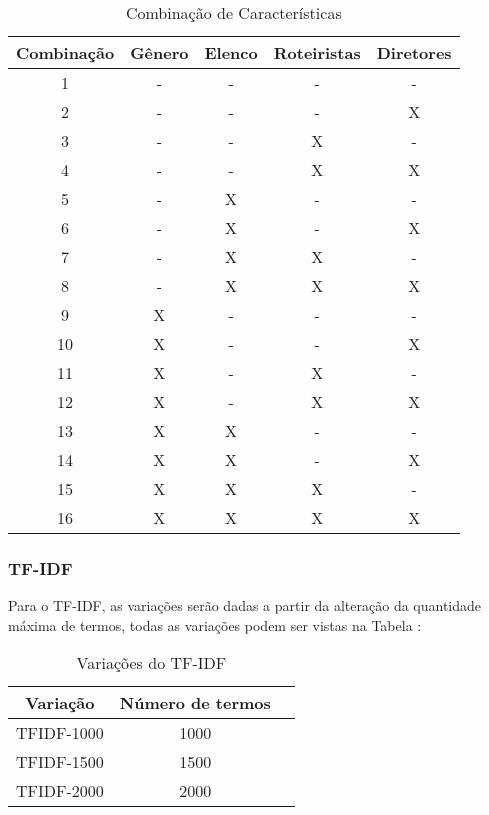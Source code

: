 \begin{table}[H]
\label{tab:combinacoes}
\centering
\begin{tabular}{|c| c | c | c | c|}
\hline
Combinação &  Gênero  & Elenco & Roteiristas & Diretores  \\ 
\hline
1 & -  & - & - & - \\
\hline
2 & -  & - & - & X\\
\hline
3 & -  & - & X & - \\
\hline
4 & -  & - & X & X \\
\hline   
5 & -  & X & - & - \\
\hline   
6 & -  & X & - & X \\
\hline   
7 & -  & X & X & - \\
\hline   
8 & -  & X & X & X \\
\hline   
9 & X  & - & - & - \\
\hline   
10 & X  & - & - & X \\
\hline  
11 & X  & - & X & - \\
\hline  
12 & X  & - & X & X \\
\hline  
13 & X  & X & - & - \\
\hline  
14 & X  & X & - & X \\
\hline  
15 & X  & X & X & - \\
\hline  
16 & X  & X & X & X \\
\hline  

\end{tabular}
\caption{\label{tab:combinacoes}Combinação de Características}
\end{table}

\subsubsection{TF-IDF}
Para o TF-IDF, as variações serão dadas a  partir da alteração da quantidade máxima de termos, todas as variações podem ser vistas na Tabela \label{tab:tfidf_vars}:
\begin{table}[H]
\label{tab:tfidf_vars}
\centering
\begin{tabular}{|c| c | c|}
\hline
Variação & Número de termos  \\ 
\hline
TFIDF-1000 & 1000 \\
\hline
TFIDF-1500  & 1500 \\
\hline
TFIDF-2000  & 2000 \\
\hline 
\end{tabular}
\caption{\label{tab:n_categorias}Variações do TF-IDF}
\end{table}

